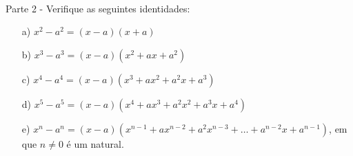 \documentclass[Calculus1/exercícios_de_cálculo.tex]{subfiles}
\begin{document}
\newpage

\paragraph{}Parte 2 - Verifique as seguintes identidades:
\begin{itemize}
	\item[a)] \(x^{2} - a^{2} = (x-a)(x+a)\)
	\item[b)] \(x^{3} - a^{3} = (x-a)(x^{2}+ax+a^{2})\)
	\item[c)] \(x^{4} - a^{4} = (x-a)(x^{3}+ax^{2}+a^{2}x+a^{3})\)
	\item[d)] \(x^{5} - a^{5} = (x-a)(x^{4} + ax^{3} + a^{2}x^{2} + a^{3}x + a^{4})\)
	\item[e)] \(x^{n}-a^{n} = (x-a)(x^{n-1} + ax^{n-2} + a^{2}x^{n-3} + \dotsc + a^{n-2}x + a^{n-1})\), em que \(n\neq0\) é um natural.
\end{itemize}
\end{document}
